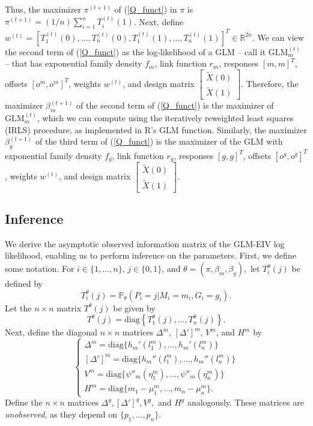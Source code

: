\documentclass[12pt]{article}
\begin{document}
\begin{appendices}
\begin{refsection}
	Thus, the maximizer $\pi^{(t+1)}$ of (\ref{Q_funct}) in $\pi$ is $\pi^{(t+1)} = (1/n)\sum_{i=1}^n T^{(t)}_i(1)$. Next, define $w^{(t)} = [T^{(t)}_1(0), \dots, T^{(t)}_n(0), T^{(t)}_1(1), \dots, T^{(t)}_n(1)]^T \in \mathbb{R}^{2n}$. We can view the second term of (\ref{Q_funct}) as the log-likelihood of a GLM -- call it $\textrm{GLM}^{(t)}_m$ -- that has exponential family density $f_m$, link function $r_m$, responses $[m,m]^T$, offsets $[o^m, o^m]^T$, weights $w^{(t)}$, and design matrix $\begin{bmatrix} \tilde{X}(0) \\ \tilde{X}(1) \end{bmatrix}.$ Therefore, the maximizer $\beta^{(t+1)}_m$ of the second term of (\ref{Q_funct}) is the maximizer of $\textrm{GLM}^{(t)}_m$, which we can compute using the iteratively reweighted least squares (IRLS) procedure, as implemented in R's GLM function. Similarly, the maximizer $\beta^{(t+1)}_g$ of the third term of (\ref{Q_funct}) is the maximizer of the GLM with exponential family density $f_g$, link function $r_g$, responses $[g,g]^T$, offsets $[o^g, o^g]^T$, weights $w^{(t)}$, and design matrix $\begin{bmatrix} \tilde{X}(0) \\ \tilde{X}(1) \end{bmatrix}.$
		
		\subsection{Inference}
		We derive the asymptotic observed information matrix of the GLM-EIV log likelihood, enabling us to perform inference on the parameters. First, we define some notation. For $i \in \{1, \dots, n\}$, $j \in \{0, 1\}$, and $\theta = (\pi, \beta_m, \beta_g),$ let $T^\theta_i(j)$ be defined by
		$$T^\theta_i(j) = \mathbb{P}_\theta\left(P_i = j | M_i = m_i, G_i = g_i\right).$$ Let the $n \times n$ matrix $T^\theta(j)$ be given by $$T^\theta(j) = \textrm{diag}\left\{T^\theta_1(j), \dots, T^\theta_n(j)\right\}.$$
		Next, define the diagonal $n \times n$ matrices $\Delta^m$, $[\Delta']^m$, $V^m$, and $H^m$ by
		$$
		\begin{cases}
		\Delta^m = \textrm{diag} \{h_m'(l_1^m), \dots, h_m'(l_n^m)\} \\
		[\Delta']^m = \textrm{diag} \{h_m''(l_1^m), \dots, h_m''(l_n^m) \} \\
		V^m = \textrm{diag} \{ \psi''_m( \eta^m_1), \dots, \psi''_m( \eta^m_n) \} \\
		H^m = \textrm{diag} \{ m_1 - \mu_1^m, \dots, m_n - \mu_n^m\}.
		\end{cases} 
		$$ Define the $n \times n$ matrices $\Delta^g, [\Delta']^g, V^g,$ and $H^g$ analogously. These matrices are \textit{unobserved}, as they depend on $\{p_1, \dots, p_n\}$.
		

\end{refsection}
\end{appendices}
\end{document}
